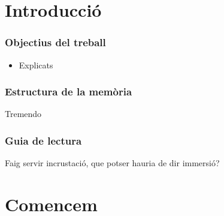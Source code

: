 \chapter{Introducci\'o}



\subsection*{Objectius del treball}

\begin{itemize}
    \item Explicats
\end{itemize}

\subsection*{Estructura de la mem\`oria}
Tremendo

\subsection*{Guia de lectura}
Faig servir incrustació, que potser hauria de dir immersió?

\newpage

\setcounter{page}{1}


\chapter{Comencem}

